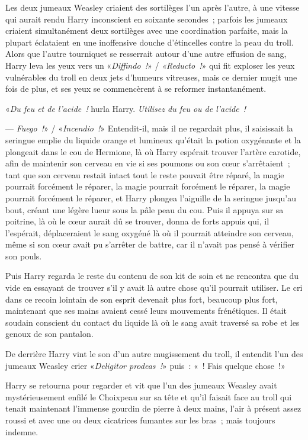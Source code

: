 Les deux jumeaux Weasley criaient des sortilèges l'un après l'autre, à une vitesse qui aurait rendu Harry inconscient en soixante secondes~; parfois les jumeaux criaient simultanément deux sortilèges avec une coordination parfaite, mais la plupart éclataient en une inoffensive douche d'étincelles contre la peau du troll. Alors que l'autre tourniquet se resserrait autour d'une autre effusion de sang, Harry leva les yeux vers un «\emph{Diffindo~!}» / \emph{«Reducto~!}» qui fit exploser les yeux vulnérables du troll en deux jets d'humeurs vitreuses, mais ce dernier mugit une fois de plus, et ses yeux se commencèrent à se reformer instantanément.

«\emph{Du feu et de l'acide~!} hurla Harry. \emph{Utilisez du feu ou de l'acide~!}

--- \emph{Fuego~!}» / «\emph{Incendio~!}» Entendit-il, mais il ne regardait plus, il saisissait la seringue emplie du liquide orange et lumineux qu'était la potion oxygénante et la plongeait dans le cou de Hermione, là où Harry espérait trouver l'artère carotide, afin de maintenir son cerveau en vie si ses poumons ou son cœur s'arrêtaient~; tant que son cerveau restait intact tout le reste pouvait être réparé, la magie pourrait forcément le réparer, la magie pourrait forcément le réparer, la magie pourrait forcément le réparer, et Harry plongea l'aiguille de la seringue jusqu'au bout, créant une légère lueur sous la pâle peau du cou. Puis il appuya sur sa poitrine, là où le cœur aurait dû se trouver, donna de forts appuis qui, il l'espérait, déplaceraient le sang oxygéné là où il pourrait atteindre son cerveau, même si son cœur avait pu s'arrêter de battre, car il n'avait pas pensé à vérifier son pouls.

Puis Harry regarda le reste du contenu de son kit de soin et ne rencontra que du vide en essayant de trouver s'il y avait là autre chose qu'il pourrait utiliser. Le cri dans ce recoin lointain de son esprit devenait plus fort, beaucoup plus fort, maintenant que ses mains avaient cessé leurs mouvements frénétiques. Il était soudain conscient du contact du liquide là où le sang avait traversé sa robe et les genoux de son pantalon.

De derrière Harry vint le son d'un autre mugissement du troll, il entendit l'un des jumeaux Weasley crier «\emph{Deligitor prodeas~!}» puis~: «~! Fais quelque chose~!»

Harry se retourna pour regarder et vit que l'un des jumeaux Weasley avait mystérieusement enfilé le Choixpeau sur sa tête et qu'il faisait face au troll qui tenait maintenant l'immense gourdin de pierre à deux mains, l'air à présent assez roussi et avec une ou deux cicatrices fumantes sur les bras~; mais toujours indemne.

